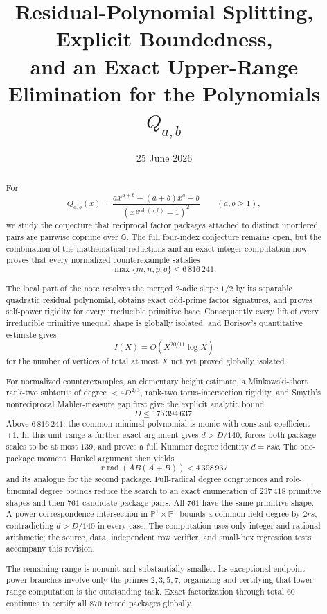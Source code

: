 \documentclass[11pt]{article}
\title{Residual-Polynomial Splitting, Explicit Boundedness,\\
and an Exact Upper-Range Elimination for the Polynomials \(Q_{a,b}\)}
\author{}
\date{25 June 2026}
\theoremstyle{definition}
\newcommand{\Q}{\mathbb Q}
\begin{document}
\maketitle

\begin{abstract}
For
\[
 Q_{a,b}(x)=
 \frac{a x^{a+b}-(a+b)x^a+b}
 {(x^{\gcd(a,b)}-1)^2}
 \qquad(a,b\geq1),
\]
we study the conjecture that reciprocal factor packages attached to distinct
unordered pairs are pairwise coprime over \(\Q\).  The full four-index
conjecture remains open, but the combination of the mathematical reductions
and an exact integer computation now proves that every normalized
counterexample satisfies
\[
 \boxed{\max\{m,n,p,q\}\leq6\,816\,241}.
\]

The local part of the note resolves the merged \(2\)-adic slope \(1/2\) by
its separable quadratic residual polynomial, obtains exact odd-prime factor
signatures, and proves self-power rigidity for every irreducible primitive
base.  Consequently every lift of every irreducible primitive unequal shape
is globally isolated, and Borisov's quantitative estimate gives
\[
 I(X)=O\!\left(X^{20/11}\log X\right)
\]
for the number of vertices of total at most \(X\) not yet proved globally
isolated.

For normalized counterexamples, an elementary height estimate, a
Minkowski-short rank-two subtorus of degree \(<4D^{2/3}\), rank-two
torus-intersection rigidity, and Smyth's nonreciprocal Mahler-measure gap
first give the explicit analytic bound
\[
 D\leq175\,394\,637.
\]
Above \(6\,816\,241\), the common minimal polynomial is monic with constant
coefficient \(\pm1\).  In this unit range a further exact argument gives
\(d>D/140\), forces both package scales to be at most \(139\), and proves a
full Kummer degree identity \(d=rsk\).  The one-package moment--Hankel
argument then yields
\[
 r\operatorname{rad}(AB(A+B))<4\,398\,937
\]
and its analogue for the second package.  Full-radical degree congruences and
role-binomial degree bounds reduce the search to an exact enumeration of
\(237\,418\) primitive shapes and then \(761\) candidate package pairs.  All
\(761\) have the same primitive shape.  A power-correspondence intersection
in \(\mathbb P^1\times\mathbb P^1\) bounds a common field degree by \(2rs\),
contradicting \(d>D/140\) in every case.  The computation uses only integer
and rational arithmetic; the source, data, independent row verifier, and
small-box regression tests accompany this revision.

The remaining range is nonunit and substantially smaller.  Its exceptional
endpoint-power branches involve only the primes \(2,3,5,7\); organizing and
certifying that lower-range computation is the outstanding task.  Exact
factorization through total \(60\) continues to certify all \(870\) tested
packages globally.
\end{abstract}
\end{document}
